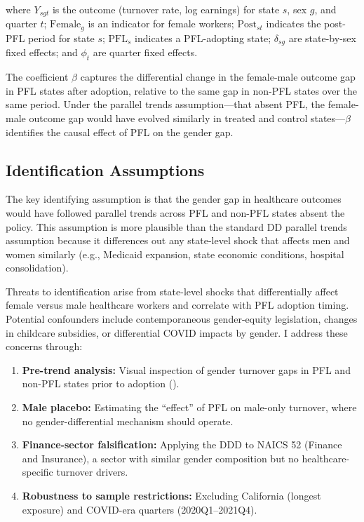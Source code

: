 \documentclass[12pt]{article}
\begin{document}
\noindent where $Y_{sgt}$ is the outcome (turnover rate, log earnings) for state $s$, sex $g$, and quarter $t$; $\text{Female}_g$ is an indicator for female workers; $\text{Post}_{st}$ indicates the post-PFL period for state $s$; $\text{PFL}_s$ indicates a PFL-adopting state; $\delta_{sg}$ are state-by-sex fixed effects; and $\phi_t$ are quarter fixed effects.

The coefficient $\beta$ captures the differential change in the female-male outcome gap in PFL states after adoption, relative to the same gap in non-PFL states over the same period. Under the parallel trends assumption---that absent PFL, the female-male outcome gap would have evolved similarly in treated and control states---$\beta$ identifies the causal effect of PFL on the gender gap.

\subsection{Identification Assumptions}

The key identifying assumption is that the gender gap in healthcare outcomes would have followed parallel trends across PFL and non-PFL states absent the policy. This assumption is more plausible than the standard DD parallel trends assumption because it differences out any state-level shock that affects men and women similarly (e.g., Medicaid expansion, state economic conditions, hospital consolidation).

Threats to identification arise from state-level shocks that differentially affect female versus male healthcare workers and correlate with PFL adoption timing. Potential confounders include contemporaneous gender-equity legislation, changes in childcare subsidies, or differential COVID impacts by gender. I address these concerns through:

\begin{enumerate}
\item \textbf{Pre-trend analysis:} Visual inspection of gender turnover gaps in PFL and non-PFL states prior to adoption ().
\item \textbf{Male placebo:} Estimating the ``effect'' of PFL on male-only turnover, where no gender-differential mechanism should operate.
\item \textbf{Finance-sector falsification:} Applying the DDD to NAICS 52 (Finance and Insurance), a sector with similar gender composition but no healthcare-specific turnover drivers.
\item \textbf{Robustness to sample restrictions:} Excluding California (longest exposure) and COVID-era quarters (2020Q1--2021Q4).
\end{enumerate}
\end{document}

